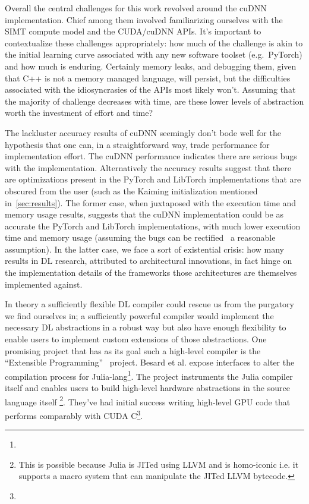 
Overall the central challenges for this work revolved around the cuDNN implementation.
Chief among them involved familiarizing ourselves with the SIMT compute model and the CUDA/cuDNN APIs.
It's important to contextualize these challenges appropriately: how much of the challenge is akin to the initial learning curve associated with any new software toolset (e.g.\ PyTorch) and how much is enduring.
Certainly memory leaks, and debugging them, given that C++ is not a memory managed language, will persist, but the difficulties associated with the idiosyncrasies of the APIs most likely won't.
Assuming that the majority of challenge decreases with time, are these lower levels of abstraction worth the investment of effort and time?

The lackluster accuracy results of cuDNN seemingly don't bode well for the hypothesis that one can, in a straightforward way, trade performance for implementation effort.
The cuDNN performance indicates there are serious bugs with the implementation.
Alternatively the accuracy results suggest that there are optimizations present in the PyTorch and LibTorch implementations that are obscured from the user (such as the Kaiming initialization mentioned in~\cref{sec:results}).
The former case, when juxtaposed with the execution time and memory usage results, suggests that the cuDNN implementation could be as accurate the PyTorch and LibTorch implementations, with much lower execution time and memory usage (assuming the bugs can be rectified \textemdash\ a reasonable assumption).
In the latter case, we face a sort of existential crisis: how many results in DL research, attributed to architectural innovations, in fact hinge on the implementation details of the frameworks those architectures are themselves implemented against.

In theory a sufficiently flexible DL compiler could rescue us from the purgatory we find ourselves in;
a sufficiently powerful compiler would implement the necessary DL abstractions in a robust way but also have enough flexibility to enable users to implement custom extensions of those abstractions.
One promising project that has as its goal such a high-level compiler is the ``Extensible Programming''~\cite{Besard_2019} project.
Besard et al. expose interfaces to alter the compilation process for Julia-lang\footnote{}.
The project instruments the Julia compiler itself and enables users to build high-level hardware abstractions in the source language itself%
\footnote{This is possible because Julia is JITed using LLVM and is homo-iconic i.e. it supports a macro system that can manipulate the JITed LLVM bytecode.}.
They've had initial success writing high-level GPU code that performs comparably with CUDA C\footnote{}.

